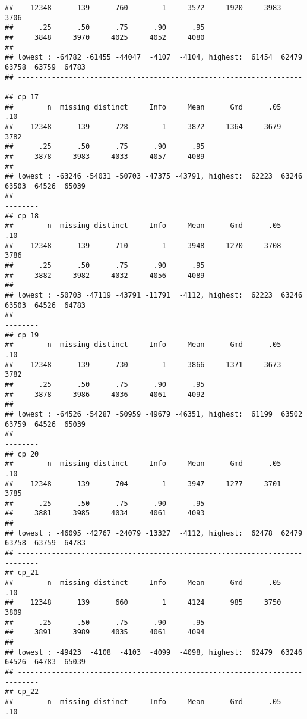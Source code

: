 \documentclass[]{article}
\begin{document}
\begin{verbatim}
##    12348      139      760        1     3572     1920    -3983     3706 
##      .25      .50      .75      .90      .95 
##     3848     3970     4025     4052     4080 
## 
## lowest : -64782 -61455 -44047  -4107  -4104, highest:  61454  62479  63758  63759  64783
## ---------------------------------------------------------------------------
## cp_17 
##        n  missing distinct     Info     Mean      Gmd      .05      .10 
##    12348      139      728        1     3872     1364     3679     3782 
##      .25      .50      .75      .90      .95 
##     3878     3983     4033     4057     4089 
## 
## lowest : -63246 -54031 -50703 -47375 -43791, highest:  62223  63246  63503  64526  65039
## ---------------------------------------------------------------------------
## cp_18 
##        n  missing distinct     Info     Mean      Gmd      .05      .10 
##    12348      139      710        1     3948     1270     3708     3786 
##      .25      .50      .75      .90      .95 
##     3882     3982     4032     4056     4089 
## 
## lowest : -50703 -47119 -43791 -11791  -4112, highest:  62223  63246  63503  64526  64783
## ---------------------------------------------------------------------------
## cp_19 
##        n  missing distinct     Info     Mean      Gmd      .05      .10 
##    12348      139      730        1     3866     1371     3673     3782 
##      .25      .50      .75      .90      .95 
##     3878     3986     4036     4061     4092 
## 
## lowest : -64526 -54287 -50959 -49679 -46351, highest:  61199  63502  63759  64526  65039
## ---------------------------------------------------------------------------
## cp_20 
##        n  missing distinct     Info     Mean      Gmd      .05      .10 
##    12348      139      704        1     3947     1277     3701     3785 
##      .25      .50      .75      .90      .95 
##     3881     3985     4034     4061     4093 
## 
## lowest : -46095 -42767 -24079 -13327  -4112, highest:  62478  62479  63758  63759  64783
## ---------------------------------------------------------------------------
## cp_21 
##        n  missing distinct     Info     Mean      Gmd      .05      .10 
##    12348      139      660        1     4124      985     3750     3809 
##      .25      .50      .75      .90      .95 
##     3891     3989     4035     4061     4094 
## 
## lowest : -49423  -4108  -4103  -4099  -4098, highest:  62479  63246  64526  64783  65039
## ---------------------------------------------------------------------------
## cp_22 
##        n  missing distinct     Info     Mean      Gmd      .05      .10 

\end{verbatim}
\end{document}
